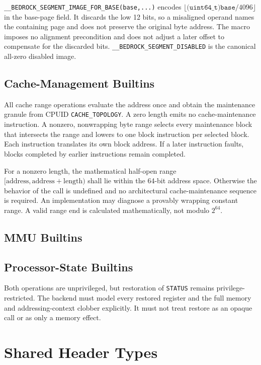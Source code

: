 \documentclass[10pt,twoside]{article}
\begin{document}
\texttt{\_\_BEDROCK\_SEGMENT\_IMAGE\_FOR\_BASE(base,...)} encodes
$\lfloor\texttt{(uint64\_t)base}/4096\rfloor$ in the base-page field. It
discards the low 12 bits, so a misaligned operand names the containing page and
does not preserve the original byte address. The macro imposes no alignment
precondition and does not adjust a later offset to compensate for the discarded
bits. \texttt{\_\_BEDROCK\_SEGMENT\_DISABLED} is the canonical all-zero
disabled image.

\subsection{Cache-Management Builtins}
All cache range operations evaluate the address once and obtain the maintenance granule from CPUID
\texttt{CACHE\_TOPOLOGY}. A zero length emits no cache-maintenance instruction. A nonzero, nonwrapping byte range
selects every maintenance block that intersects the range and lowers to one block instruction per selected block.
Each instruction translates its own block address. If a later instruction faults, blocks completed by earlier
instructions remain completed.

For a nonzero length, the mathematical half-open range
$[\mathrm{address},\mathrm{address}+\mathrm{length})$ shall lie within the
64-bit address space. Otherwise the behavior of the call is undefined and no
architectural cache-maintenance sequence is required. An implementation may
diagnose a provably wrapping constant range. A valid range end is calculated
mathematically, not modulo $2^{64}$.



\subsection{MMU Builtins}


\Needspace{2.0in}
\subsection{Processor-State Builtins}


Both operations are unprivileged, but restoration of \texttt{STATUS} remains
privilege-restricted. The backend must model every restored register and the
full memory and addressing-context clobber explicitly. It must not treat
restore as an opaque call or as only a memory effect.

\section{Shared Header Types}\label{page:shared-header-types}

\end{document}
